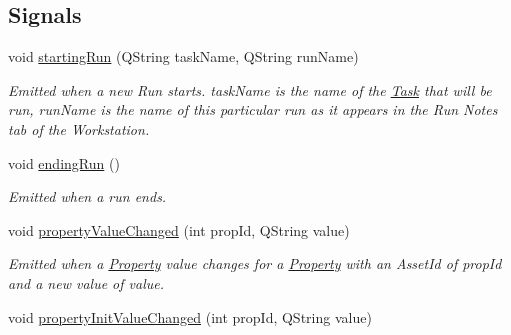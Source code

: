 \subsection*{Signals}
\begin{DoxyCompactItemize}
\item 
\hypertarget{class_picto_1_1_playback_state_updater_ae6d0359b1df084e860faf31ccb059586}{void \hyperlink{class_picto_1_1_playback_state_updater_ae6d0359b1df084e860faf31ccb059586}{starting\-Run} (Q\-String task\-Name, Q\-String run\-Name)}\label{class_picto_1_1_playback_state_updater_ae6d0359b1df084e860faf31ccb059586}

\begin{DoxyCompactList}\small\item\em Emitted when a new Run starts. task\-Name is the name of the \hyperlink{class_picto_1_1_task}{Task} that will be run, run\-Name is the name of this particular run as it appears in the Run Notes tab of the Workstation. \end{DoxyCompactList}\item 
\hypertarget{class_picto_1_1_playback_state_updater_a445f152d2ffebcf29dc03ca0542feb76}{void \hyperlink{class_picto_1_1_playback_state_updater_a445f152d2ffebcf29dc03ca0542feb76}{ending\-Run} ()}\label{class_picto_1_1_playback_state_updater_a445f152d2ffebcf29dc03ca0542feb76}

\begin{DoxyCompactList}\small\item\em Emitted when a run ends. \end{DoxyCompactList}\item 
\hypertarget{class_picto_1_1_playback_state_updater_accc166a761db822db7d709ecafbe5a86}{void \hyperlink{class_picto_1_1_playback_state_updater_accc166a761db822db7d709ecafbe5a86}{property\-Value\-Changed} (int prop\-Id, Q\-String value)}\label{class_picto_1_1_playback_state_updater_accc166a761db822db7d709ecafbe5a86}

\begin{DoxyCompactList}\small\item\em Emitted when a \hyperlink{class_picto_1_1_property}{Property} value changes for a \hyperlink{class_picto_1_1_property}{Property} with an Asset\-Id of prop\-Id and a new value of value. \end{DoxyCompactList}\item 
\hypertarget{class_picto_1_1_playback_state_updater_a8d4e94e5171d165db822c5c5740c01ce}{void \hyperlink{class_picto_1_1_playback_state_updater_a8d4e94e5171d165db822c5c5740c01ce}{property\-Init\-Value\-Changed} (int prop\-Id, Q\-String value)}\label{class_picto_1_1_playback_state_updater_a8d4e94e5171d165db822c5c5740c01ce}


\end{DoxyCompactItemize}
